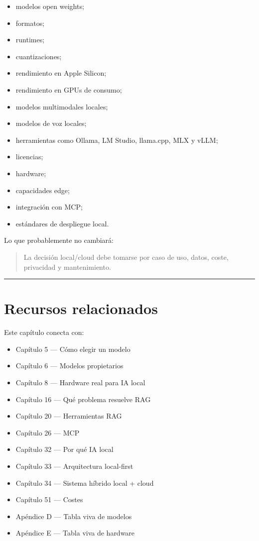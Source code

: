 \begin{itemize}
\tightlist
\item
  modelos open weights;
\item
  formatos;
\item
  runtimes;
\item
  cuantizaciones;
\item
  rendimiento en Apple Silicon;
\item
  rendimiento en GPUs de consumo;
\item
  modelos multimodales locales;
\item
  modelos de voz locales;
\item
  herramientas como Ollama, LM Studio, llama.cpp, MLX y vLLM;
\item
  licencias;
\item
  hardware;
\item
  capacidades edge;
\item
  integración con MCP;
\item
  estándares de despliegue local.
\end{itemize}

Lo que probablemente no cambiará:

\begin{quote}
La decisión local/cloud debe tomarse por caso de uso, datos, coste,
privacidad y mantenimiento.
\end{quote}

\begin{center}\rule{0.5\linewidth}{0.5pt}\end{center}

\section{Recursos relacionados}\label{recursos-relacionados-6}

Este capítulo conecta con:

\begin{itemize}
\tightlist
\item
  Capítulo 5 --- Cómo elegir un modelo
\item
  Capítulo 6 --- Modelos propietarios
\item
  Capítulo 8 --- Hardware real para IA local
\item
  Capítulo 16 --- Qué problema resuelve RAG
\item
  Capítulo 20 --- Herramientas RAG
\item
  Capítulo 26 --- MCP
\item
  Capítulo 32 --- Por qué IA local
\item
  Capítulo 33 --- Arquitectura local-first
\item
  Capítulo 34 --- Sistema híbrido local + cloud
\item
  Capítulo 51 --- Costes
\item
  Apéndice D --- Tabla viva de modelos
\item
  Apéndice E --- Tabla viva de hardware
\end{itemize}

